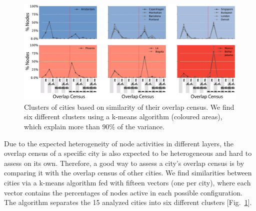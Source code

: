 \begin{figure}[t!]
	\centering
	\includegraphics[width=\textwidth]{images/multiplex/ResultsOverlapCensus-01.png}
	\caption[Overlap Census clusters]{
		Clusters of cities based on similarity of their overlap census. We find six different clusters using a k-means algorithm (coloured areas), which explain more than $90\%$ of the variance.
		}
	\label{fig:ResultsOverlapCensus}
\end{figure}

Due to the expected heterogeneity of node activities in different layers, the overlap census of a specific city is also expected to be heterogeneous and hard to assess on its own. Therefore, a good way to assess a city's overlap census is by comparing it with the overlap census of other cities. We find similarities between cities via a k-means algorithm fed with fifteen vectors (one per city), where each vector contains the percentages of nodes active in each possible configuration. The algorithm separates the 15 analyzed cities into six different clusters [Fig.~\ref{fig:ResultsOverlapCensus}].

